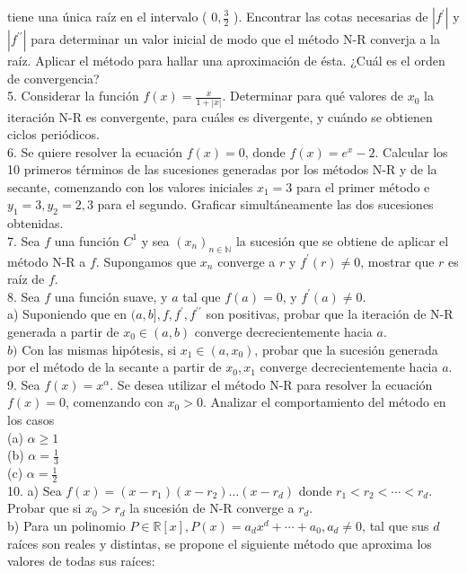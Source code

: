 \documentclass[10pt]{article}
\begin{document}
tiene una única raíz en el intervalo ( $0, \frac{3}{2}$ ). Encontrar las cotas necesarias de $\left|f^{\prime}\right|$ y $\left|f^{\prime \prime}\right|$ para determinar un valor inicial de modo que el método N-R converja a la raíz. Aplicar el método para hallar una aproximación de ésta. ¿Cuál es el orden de convergencia?\\
5. Considerar la función $f(x)=\frac{x}{1+|x|}$. Determinar para qué valores de $x_{0}$ la iteración N-R es convergente, para cuáles es divergente, y cuándo se obtienen ciclos periódicos.\\
6. Se quiere resolver la ecuación $f(x)=0$, donde $f(x)=e^{x}-2$. Calcular los 10 primeros términos de las sucesiones generadas por los métodos N-R y de la secante, comenzando con los valores iniciales $x_{1}=3$ para el primer método e $y_{1}=3, y_{2}=2,3$ para el segundo. Graficar simultáneamente las dos sucesiones obtenidas.\\
7. Sea $f$ una función $C^{1}$ y sea $\left(x_{n}\right)_{n \in \mathbb{N}}$ la sucesión que se obtiene de aplicar el método N-R a $f$. Supongamos que $x_{n}$ converge a $r$ y $f^{\prime}(r) \neq 0$, mostrar que $r$ es raíz de $f$.\\
8. Sea $f$ una función suave, y $a$ tal que $f(a)=0$, y $f^{\prime}(a) \neq 0$.\\
a) Suponiendo que en $(a, b], f, f^{\prime}, f^{\prime \prime}$ son positivas, probar que la iteración de N-R generada a partir de $x_{0} \in(a, b)$ converge decrecientemente hacia $a$.\\
$b)$ Con las mismas hipótesis, si $x_{1} \in\left(a, x_{0}\right)$, probar que la sucesión generada por el método de la secante a partir de $x_{0}, x_{1}$ converge decrecientemente hacia $a$.\\
9. Sea $f(x)=x^{\alpha}$. Se desea utilizar el método N-R para resolver la ecuación $f(x)=0$, comenzando con $x_{0}>0$. Analizar el comportamiento del método en los casos\\
(a) $\alpha \geq 1$\\
(b) $\alpha=\frac{1}{3}$\\
(c) $\alpha=\frac{1}{2}$\\
10. a) Sea $f(x)=\left(x-r_{1}\right)\left(x-r_{2}\right) \ldots\left(x-r_{d}\right)$ donde $r_{1}<r_{2}<\cdots<r_{d}$. Probar que si $x_{0}>r_{d}$ la sucesión de N-R converge a $r_{d}$.\\
b) Para un polinomio $P \in \mathbb{R}[x], P(x)=a_{d} x^{d}+\cdots+a_{0}, a_{d} \neq 0$, tal que sus $d$ raíces son reales y distintas, se propone el siguiente método que aproxima los valores de todas sus raíces:
\end{document}
